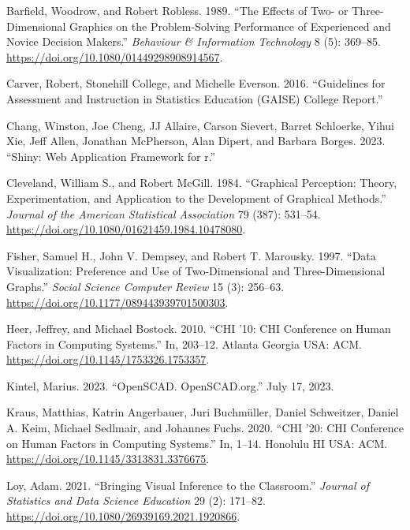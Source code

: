 \documentclass[
  12pt,
]{article}
\newlength{\cslhangindent}
\newenvironment{CSLReferences}[2] %
 {\begin{list}{}{%
  \setlength{\itemindent}{0pt}
  \setlength{\leftmargin}{0pt}
  \setlength{\parsep}{0pt}
  \ifodd #1
   \setlength{\leftmargin}{\cslhangindent}
   \setlength{\itemindent}{-1\cslhangindent}
  \fi
  \setlength{\itemsep}{#2\baselineskip}}}
 {\end{list}}
\begin{document}
\label{refs}
\begin{CSLReferences}{1}{0}
Barfield, Woodrow, and Robert Robless. 1989. {``The Effects of Two- or
Three-Dimensional Graphics on the Problem-Solving Performance of
Experienced and Novice Decision Makers.''} \emph{Behaviour \&
Information Technology} 8 (5): 369--85.
\url{https://doi.org/10.1080/01449298908914567}.

Carver, Robert, Stonehill College, and Michelle Everson. 2016.
{``Guidelines for Assessment and Instruction in Statistics Education
(GAISE) College Report.''}

Chang, Winston, Joe Cheng, JJ Allaire, Carson Sievert, Barret Schloerke,
Yihui Xie, Jeff Allen, Jonathan McPherson, Alan Dipert, and Barbara
Borges. 2023. {``Shiny: Web Application Framework for r.''}

Cleveland, William S., and Robert McGill. 1984. {``Graphical Perception:
Theory, Experimentation, and Application to the Development of Graphical
Methods.''} \emph{Journal of the American Statistical Association} 79
(387): 531--54. \url{https://doi.org/10.1080/01621459.1984.10478080}.

Fisher, Samuel H., John V. Dempsey, and Robert T. Marousky. 1997.
{``Data Visualization: Preference and Use of Two-Dimensional and
Three-Dimensional Graphs.''} \emph{Social Science Computer Review} 15
(3): 256--63. \url{https://doi.org/10.1177/089443939701500303}.

Heer, Jeffrey, and Michael Bostock. 2010. {``CHI '10: CHI Conference on
Human Factors in Computing Systems.''} In, 203--12. Atlanta Georgia USA:
ACM. \url{https://doi.org/10.1145/1753326.1753357}.

Kintel, Marius. 2023. {``{OpenSCAD}. {OpenSCAD}.org.''} July 17, 2023.

Kraus, Matthias, Katrin Angerbauer, Juri Buchmüller, Daniel Schweitzer,
Daniel A. Keim, Michael Sedlmair, and Johannes Fuchs. 2020. {``CHI '20:
CHI Conference on Human Factors in Computing Systems.''} In, 1--14.
Honolulu HI USA: ACM. \url{https://doi.org/10.1145/3313831.3376675}.

Loy, Adam. 2021. {``Bringing Visual Inference to the Classroom.''}
\emph{Journal of Statistics and Data Science Education} 29 (2): 171--82.
\url{https://doi.org/10.1080/26939169.2021.1920866}.


\end{CSLReferences}
\end{document}
